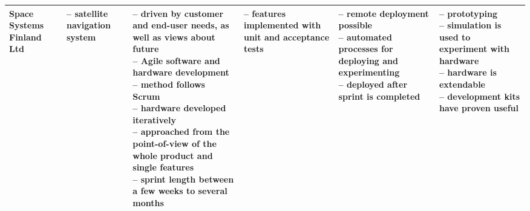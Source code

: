 \documentclass[english]{tktltiki2}
\begin{document}
\begin{landscape}
\begin{longtable}{|p{2.5cm}|p{1.5cm}|p{4cm}|p{4cm}|p{4cm}|p{4cm}|}
        Space Systems Finland Ltd &
        – satellite navigation system &
        \parbox[t]{4cm}{– driven by customer and end-user needs, as well as views about future \\
                        – Agile software and hardware development \\
                        – method follows Scrum \\
                        – hardware developed iteratively \\
                        – approached from the point-of-view of the whole product and single features \\
                        – sprint length between a few weeks to several months} &
        \parbox[t]{4cm}{– features implemented with unit and acceptance tests} &
        \parbox[t]{4cm}{– remote deployment possible \\
                        – automated processes for deploying and experimenting \\
                        – deployed after sprint is completed} &
        \parbox[t]{4cm}{– prototyping \\
                        – simulation is used to experiment with hardware \\
                        – hardware is extendable \\
                        – development kits have proven useful} \\

        \hline


\end{longtable}
\end{landscape}
\end{document}
